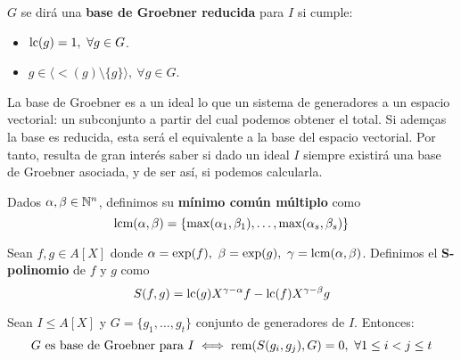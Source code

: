 \begin{definicion}
  $G$ se dirá una \textbf{base de Groebner reducida} para $I$ si cumple:
  \begin{itemize}
    \item $\text{lc}(g)=1,\ \forall g\in G$.
    \item $g\in \langle \lt(g) \setminus \{g\} \rangle,\ \forall g\in G$.
  \end{itemize}
\end{definicion}

La base de Groebner es a un ideal lo que un sistema de generadores a un espacio vectorial: un subconjunto a partir del cual podemos obtener el total. Si ademças la base es reducida, esta será el equivalente a la base del espacio vectorial. Por tanto, resulta de gran interés saber si dado un ideal $I$ siempre existirá una base de Groebner asociada, y de ser así, si podemos calcularla.

\begin{definicion}
  Dados $\alpha,\beta \in \mathbb{N}^n$, definimos su \textbf{mínimo común múltiplo} como
  \begin{equation*}
    \text{lcm}(\alpha,\beta) = \{\max(\alpha_1, \beta_1),\dots, \max(\alpha_s, \beta_s)\}
  \end{equation*}
\end{definicion}

\begin{definicion}
  Sean $f,g \in A[X]$ donde $\alpha=\exp(f),\ \beta=\exp(g),\ \gamma = \text{lcm}(\alpha,\beta)$. Definimos el \textbf{S-polinomio} de $f$ y $g$ como
  \begin{equation*}
    S(f,g) = \text{lc}(g)X^{\gamma-\alpha}f - \text{lc}(f)X^{\gamma-\beta}g
  \end{equation*}
\end{definicion}

\begin{teorema}
  Sean $I\le A[X]$ y $G=\{g_1,\dots, g_t\}$ conjunto de generadores de $I$. Entonces:
  \begin{equation*}
    G \text{ es base de Groebner para } I \iff \text{rem}(S(g_i,g_j), G)=0,\ \forall 1\le i<j\le t
  \end{equation*}
\end{teorema}